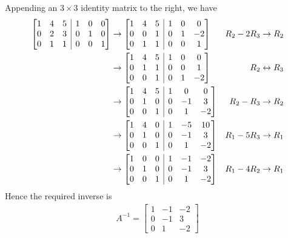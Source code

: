 \begin{solution}
Appending an $3 \times 3$ identity matrix to the right, we have
\begin{align*}
\left[\begin{array}{@{}ccc|ccc@{}}
1 & 4 & 5 & 1 & 0 & 0 \\
0 & 2 & 3 & 0 & 1 & 0 \\
0 & 1 & 1 & 0 & 0 & 1
\end{array}\right] 
& \to
\left[\begin{array}{@{}ccc|ccc@{}}
1 & 4 & 5 & 1 & 0 & 0 \\
0 & 0 & 1 & 0 & 1 & -2 \\
0 & 1 & 1 & 0 & 0 & 1
\end{array}\right] & R_2 - 2R_3 \to R_2 \\
& \to
\left[\begin{array}{@{}ccc|ccc@{}}
1 & 4 & 5 & 1 & 0 & 0 \\
0 & 1 & 1 & 0 & 0 & 1 \\
0 & 0 & 1 & 0 & 1 & -2 
\end{array}\right] & R_2 \leftrightarrow R_3 \\
& \to
\left[\begin{array}{@{}ccc|ccc@{}}
1 & 4 & 5 & 1 & 0 & 0 \\
0 & 1 & 0 & 0 & -1 & 3 \\
0 & 0 & 1 & 0 & 1 & -2 
\end{array}\right] & R_2 - R_3 \to R_2 \\
& \to
\left[\begin{array}{@{}ccc|ccc@{}}
1 & 4 & 0 & 1 & -5 & 10 \\
0 & 1 & 0 & 0 & -1 & 3 \\
0 & 0 & 1 & 0 & 1 & -2 
\end{array}\right] & R_1 - 5R_3 \to R_1 \\
& \to
\left[\begin{array}{@{}ccc|ccc@{}}
1 & 0 & 0 & 1 & -1 & -2 \\
0 & 1 & 0 & 0 & -1 & 3 \\
0 & 0 & 1 & 0 & 1 & -2 
\end{array}\right] & R_1 - 4R_2 \to R_1 
\end{align*}
Hence the required inverse is
\begin{align*}
A^{-1} =
\begin{bmatrix}
1 & -1 & -2 \\
0 & -1 & 3 \\
0 & 1 & -2 
\end{bmatrix}    
\end{align*}
\end{solution}

